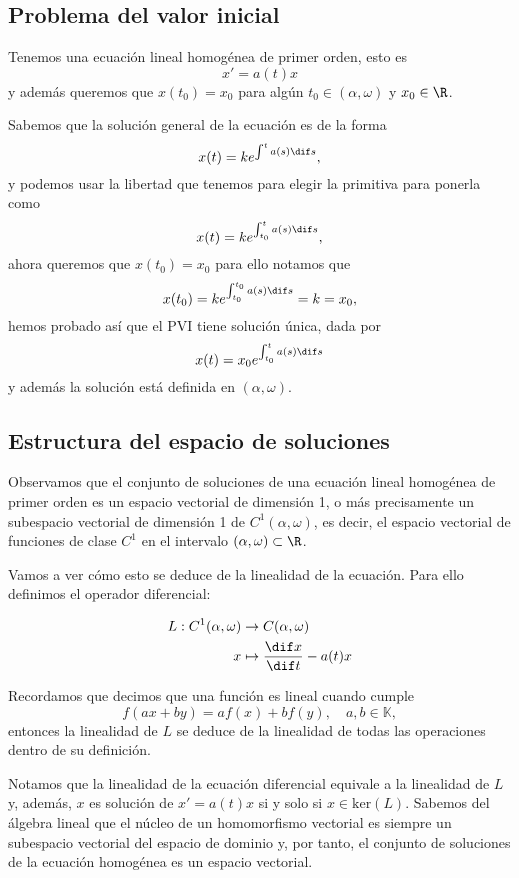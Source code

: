 \documentclass[../main.tex]{subfiles}
\begin{document}
\subsection{Problema del valor inicial}

Tenemos una ecuación lineal homogénea de primer orden, esto es
\[x' = a(t)x\]
y además queremos que \(x(t_0) = x_0\) para algún \(t_0 \in (\alpha, \omega)\) y
\(x_0 \in \R\).

Sabemos que la solución general de la ecuación es de la forma
\[x(t) = k e^{\int^t a(s) \dif s},\]
y podemos usar la libertad que tenemos para elegir la primitiva para ponerla como
\[x(t) = k e^{\int_{t_0}^t a(s) \dif s},\]
ahora queremos que \(x(t_0) = x_0\) para ello notamos que
\[x(t_0) = k e^{\int_{t_0}^{t_0} a(s) \dif s} = k = x_0,\]
hemos probado así que el PVI tiene solución única, dada por
\[x(t) = x_0 e^{\int_{t_0}^t a(s) \dif s}\]
y además la solución está definida en \((\alpha, \omega)\).

\subsection{Estructura del espacio de soluciones}

Observamos que el conjunto de soluciones de una ecuación lineal homogénea de
primer orden es un espacio vectorial de dimensión 1, o más precisamente un
subespacio vectorial de dimensión 1 de \(C^1(\alpha, \omega)\), es decir, el
espacio vectorial de funciones de clase \(C^1\) en el intervalo
\((\alpha, \omega) \subset \R\).

Vamos a ver cómo esto se deduce de la linealidad de la ecuación. Para ello
definimos el operador diferencial:

\begin{align*}
  L : C^1(\alpha, \omega) &\to C(\alpha, \omega) \\
  x &\mapsto \frac{\dif x}{\dif t} - a(t)x
\end{align*}

Recordamos que decimos que una función es lineal cuando cumple
\[f(ax + by) = af(x) + bf(y), \quad a, b \in \mathbb{K},\]
entonces la linealidad de \(L\) se deduce de la linealidad de todas las
operaciones dentro de su definición.

Notamos que la linealidad de la ecuación diferencial equivale a la linealidad de
\(L\) y, además, \(x\) es solución de \(x' = a(t)x\) si y solo si
\(x \in \text{ker}(L)\). Sabemos del álgebra lineal que el núcleo de un
homomorfismo vectorial es siempre un subespacio vectorial del espacio de dominio
y, por tanto, el conjunto de soluciones de la ecuación homogénea es un espacio
vectorial.
\end{document}
